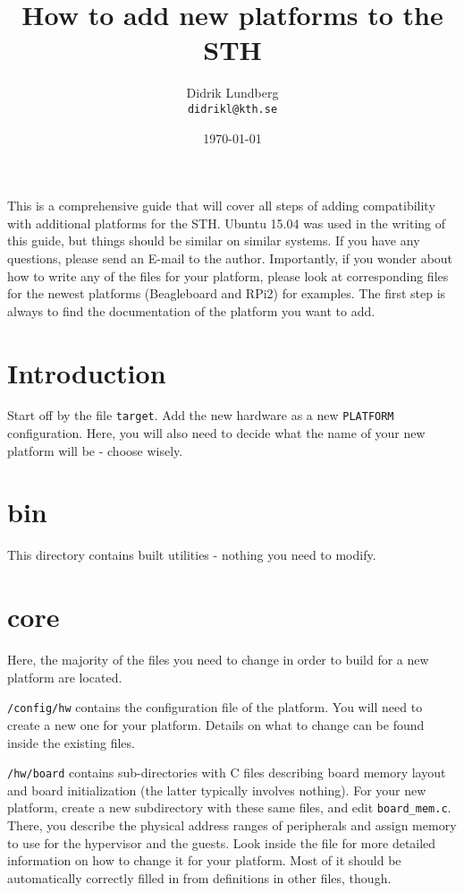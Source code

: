 \documentclass[a4paper,11pt,reqno]{amsart}
\title{How to add new platforms to the STH}
\author{Didrik Lundberg\\
\texttt{didrikl@kth.se}}
\date{\today}
\begin{document}
\maketitle
\noindent
This is a comprehensive guide that will cover all steps of adding compatibility with additional platforms for the STH. Ubuntu 15.04 was used in the writing of this guide, but things should be similar on similar systems. If you have any questions, please send an E-mail to the author. Importantly, if you wonder about how to write any of the files for your platform, please look at corresponding files for the newest platforms (Beagleboard and RPi2) for examples. The first step is always to find the documentation of the platform you want to add.

\section{Introduction}
Start off by the file \texttt{target}. Add the new hardware as a new \texttt{PLATFORM} configuration. Here, you will also need to decide what the name of your new platform will be - choose wisely.

\section{bin}
This directory contains built utilities - nothing you need to modify.

\section{core}
Here, the majority of the files you need to change in order to build for a new platform are located.

\texttt{/config/hw} contains the configuration file of the platform. You will need to create a new one for your platform. Details on what to change can be found inside the existing files.

\texttt{/hw/board} contains sub-directories with C files describing board memory layout and board initialization (the latter typically involves nothing). For your new platform, create a new subdirectory with these same files, and edit \texttt{board_mem.c}. There, you describe the physical address ranges of peripherals and assign memory to use for the hypervisor and the guests. Look inside the file for more detailed information on how to change it for your platform. Most of it should be automatically correctly filled in from definitions in other files, though.
\end{document}
